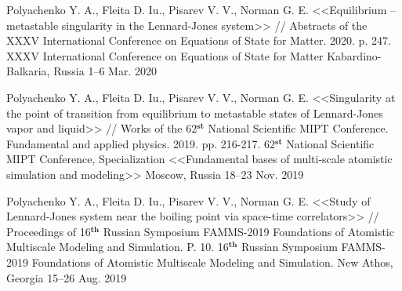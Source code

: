 

\begin{cventries}


  \cventry
    {Polyachenko Y. A., Fleita D. Iu., Pisarev V. V., Norman G. E. <<Equilibrium – metastable singularity in the Lennard-Jones system>> // Abstracts of the XXXV International Conference on Equations of State for Matter. 2020. p. 247.} %
    {XXXV International Conference on Equations of State for Matter} %
    {Kabardino-Balkaria, Russia} %
    {1--6 Mar. 2020} %
    {
      \begin{cvitems} %
      \end{cvitems}
    }


  \cventry
    {Polyachenko Y. A., Fleita D. Iu., Pisarev V. V., Norman G. E. <<Singularity at the point of transition from equilibrium to metastable states of Lennard-Jones vapor and liquid>> // Works of the 62$^{\textbf{st}}$ National Scientific MIPT Conference. Fundamental and applied physics. 2019. pp. 216-217.} %
    {62$^{\textbf{st}}$ National Scientific MIPT Conference, Specialization <<Fundamental bases of multi-scale atomistic simulation and modeling>>} %
    {Moscow, Russia} %
    {18--23 Nov. 2019} %
    {
      \begin{cvitems} %
      \end{cvitems}
    }


  \cventry
    {Polyachenko Y. A., Fleita D. Iu., Pisarev V. V., Norman G. E. <<Study of Lennard-Jones system near the boiling point via space-time correlators>> // Proceedings of 16$^{\textbf{th}}$ Russian Symposium FAMMS-2019 Foundations of Atomistic Multiscale Modeling and Simulation. P. 10.} %
    {16$^{\textbf{th}}$ Russian Symposium FAMMS-2019 Foundations of Atomistic Multiscale Modeling and Simulation.} %
    {New Athos, Georgia} %
    {15--26 Aug. 2019} %
    {
      \begin{cvitems} %
      \end{cvitems}
    }
    

\end{cventries}
